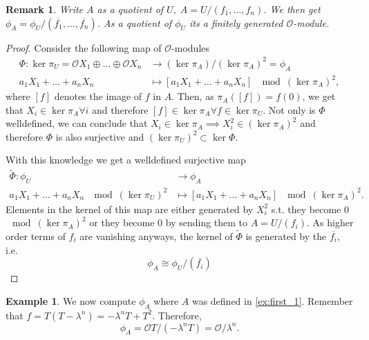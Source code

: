 \documentclass{article}
\theoremstyle{plain}%
\newtheorem{remark}{Remark}[section]
\theoremstyle{definition}
\newtheorem{example}{Example}[section]
\theoremstyle{remark}
\begin{document}
    \begin{remark}
        Write \(A\) as a quotient of \(U,\; A = U/(f_1, \dots, f_n)\).
        We then get \(\phi_A = \phi_U/(\overline{f_1}, \dots, \overline{f_n})\).
        As a quotient of \(\phi_U\) its a finitely generated \(\mathcal{O}\)-module.
    \end{remark}
    \begin{proof}
        Consider the following map of \(\mathcal{O}\)-modules
        \begin{align*}
            \Phi\colon \ker \pi_U = \mathcal{O}X_1 \oplus \dots \oplus \mathcal{O}X_n &\to (\ker \pi_A)/(\ker \pi_A)^2 = \phi_A\\
            a_1X_1 + \dots + a_nX_n &\mapsto [a_1X_1 + \dots + a_nX_n] \; \mod (\ker \pi_A)^2,
        \end{align*}
        where \([f]\) denotes the image of \(f\) in \(A\).
        Then, as \(\pi_A([f]) = f(0)\), we get that \(X_i \in \ker \pi_A \forall i\)
        and therefore \([f] \in \ker \pi_A \forall f \in \ker \pi_U\). Not only is \(\Phi\) welldefined,
        we can conclude that \(X_i \in \ker \pi_A \implies X_i^2 \in (\ker \pi_A)^2\)
        and therefore \(\Phi\) is also surjective and \((\ker \pi_U)^2 \subset \ker \Phi\).
        
        With this knowledge we get a welldefined surjective map
        \begin{align*}
            \tilde \Phi\colon \phi_U &\to \phi_A\\
            a_1X_1 + \dots + a_nX_n \; \mod (\ker \pi_U)^2 &\mapsto [a_1X_1 + \dots + a_nX_n] \; \mod (\ker \pi_A)^2.
        \end{align*}
        Elements in the kernel of this map are either generated by \(X_i^2\) s.t. they become 0 \(\mod (\ker \pi_A)^2\)
        or they become 0 by sending them to \(A = U/(f_i)\).
        As higher order terms of \(f_i\) are vanishing anyways, 
        the kernel of \(\tilde \Phi\) is generated by the \(\overline{f_i}\), i.e.
        \[
            \phi_A \cong \phi_U/(\overline{f_i})  
        \]
    \end{proof}

    \begin{example}\label{ex:first_phi}
        We now compute \(\phi_A\) where \(A\) was defined in \cref{ex:first_1}.
        Remember that \(f = T(T-\lambda^n) = -\lambda^n T + T^2\). Therefore,
        \[\phi_A = \mathcal{O}T/(-\lambda^n T) = \mathcal{O}/\lambda^n.\]
    \end{example}
\end{document}
